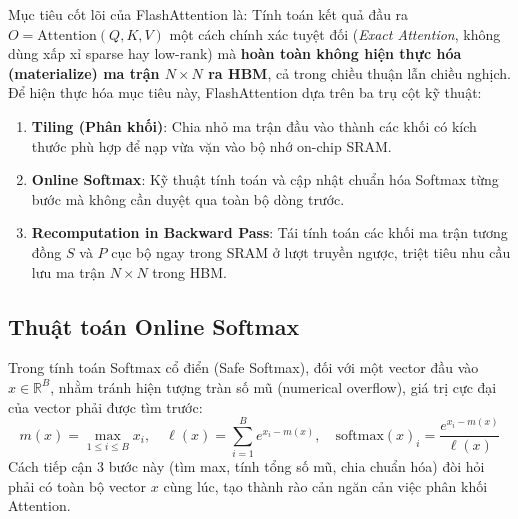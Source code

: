 \documentclass[10pt,a4paper]{article}
\begin{document}
Mục tiêu cốt lõi của FlashAttention là: Tính toán kết quả đầu ra $O = \text{Attention}(Q, K, V)$ một cách chính xác tuyệt đối (\textit{Exact Attention}, không dùng xấp xỉ sparse hay low-rank) mà \textbf{hoàn toàn không hiện thực hóa (materialize) ma trận $N \times N$ ra HBM}, cả trong chiều thuận lẫn chiều nghịch. Để hiện thực hóa mục tiêu này, FlashAttention dựa trên ba trụ cột kỹ thuật:
\begin{enumerate}
    \item \textbf{Tiling (Phân khối)}: Chia nhỏ ma trận đầu vào thành các khối có kích thước phù hợp để nạp vừa vặn vào bộ nhớ on-chip SRAM.
    \item \textbf{Online Softmax}: Kỹ thuật tính toán và cập nhật chuẩn hóa Softmax từng bước mà không cần duyệt qua toàn bộ dòng trước.
    \item \textbf{Recomputation in Backward Pass}: Tái tính toán các khối ma trận tương đồng $S$ và $P$ cục bộ ngay trong SRAM ở lượt truyền ngược, triệt tiêu nhu cầu lưu ma trận $N \times N$ trong HBM.
\end{enumerate}

\subsection{Thuật toán Online Softmax}
Trong tính toán Softmax cổ điển (Safe Softmax), đối với một vector đầu vào $x \in \mathbb{R}^B$, nhằm tránh hiện tượng tràn số mũ (numerical overflow), giá trị cực đại của vector phải được tìm trước:
\begin{equation}
m(x) = \max_{1 \le i \le B} x_i, \quad \ell(x) = \sum_{i=1}^B e^{x_i - m(x)}, \quad \text{softmax}(x)_i = \frac{e^{x_i - m(x)}}{\ell(x)}
\end{equation}
Cách tiếp cận 3 bước này (tìm max, tính tổng số mũ, chia chuẩn hóa) đòi hỏi phải có toàn bộ vector $x$ cùng lúc, tạo thành rào cản ngăn cản việc phân khối Attention.
\end{document}
